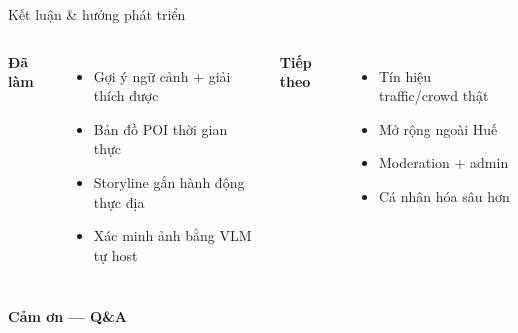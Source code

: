 \documentclass[aspectratio=169, 10pt]{beamer}
\begin{document}
\begin{frame}{Kết luận \& hướng phát triển}
  \begin{columns}[T]
  \textbf{Đã làm}
  \begin{itemize}\footnotesize
    \item Gợi ý ngữ cảnh + giải thích được
    \item Bản đồ POI thời gian thực
    \item Storyline gắn hành động thực địa
    \item Xác minh ảnh bằng VLM tự host
  \end{itemize}
  \textbf{Tiếp theo}
  \begin{itemize}\footnotesize
    \item Tín hiệu traffic/crowd thật
    \item Mở rộng ngoài Huế
    \item Moderation + admin
    \item Cá nhân hóa sâu hơn
  \end{itemize}
  \end{columns}
  \vfill
  \begin{center}\large\color{UFTblue}\textbf{Cảm ơn --- Q\&A}\end{center}
\end{frame}
\end{document}
